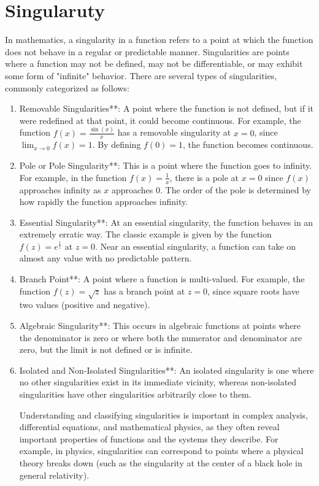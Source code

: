 \documentclass[a4paper,12pt]{article} %
\begin{document}
\newpage
\section{\textbf{Singularuty}}
In mathematics, a singularity in a function refers to a point at which the function does not behave in a regular or predictable manner. Singularities are points where a function may not be defined, may not be differentiable, or may exhibit some form of "infinite" behavior. There are several types of singularities, commonly categorized as follows:
\begin{enumerate}
   \item Removable Singularities**: A point where the function is not defined, but if it were redefined at that point, it could become continuous. For example, the function \( f(x) = \frac{\sin(x)}{x} \) has a removable singularity at \( x = 0 \), since \( \lim_{x \to 0} f(x) = 1 \). By defining \( f(0) = 1 \), the function becomes continuous.

   \item Pole or Pole Singularity**: This is a point where the function goes to infinity. For example, in the function \( f(x) = \frac{1}{x} \), there is a pole at \( x = 0 \) since \( f(x) \) approaches infinity as \( x \) approaches 0. The order of the pole is determined by how rapidly the function approaches infinity.

   \item Essential Singularity**: At an essential singularity, the function behaves in an extremely erratic way. The classic example is given by the function \( f(z) = e^{\frac{1}{z}} \) at \( z = 0 \). Near an essential singularity, a function can take on almost any value with no predictable pattern.

   \item Branch Point**: A point where a function is multi-valued. For example, the function \( f(z) = \sqrt{z} \) has a branch point at \( z = 0 \), since square roots have two values (positive and negative).

   \item Algebraic Singularity**: This occurs in algebraic functions at points where the denominator is zero or where both the numerator and denominator are zero, but the limit is not defined or is infinite.

   \item Isolated and Non-Isolated Singularities**: An isolated singularity is one where no other singularities exist in its immediate vicinity, whereas non-isolated singularities have other singularities arbitrarily close to them.

Understanding and classifying singularities is important in complex analysis, differential equations, and mathematical physics, as they often reveal important properties of functions and the systems they describe. For example, in physics, singularities can correspond to points where a physical theory breaks down (such as the singularity at the center of a black hole in general relativity).
\end{enumerate}
\end{document}

